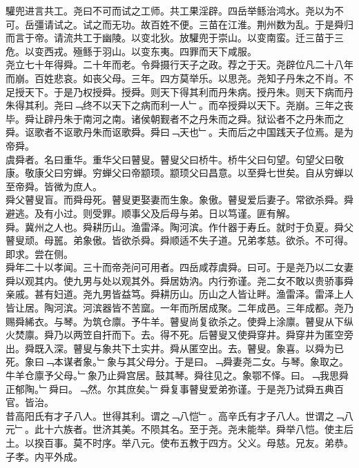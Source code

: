 \documentclass{zhvt-classic}
\begin{document}
\hspace*{2em}驩兜进言共工。尧曰不可而试之工师。共工果淫辟。四岳举鲧治鸿水。尧以为不可。岳彊请试之。试之而无功。故百姓不便。三苗在江淮。荆州数为乱。于是舜归而言于帝。请流共工于幽陵。以变北狄。放驩兜于崇山。以变南蛮。迁三苗于三危。以变西戎。殛鲧于羽山。以变东夷。四罪而天下咸服。\\
\hspace*{2em}尧立七十年得舜。二十年而老。令舜摄行天子之政。荐之于天。尧辟位凡二十八年而崩。百姓悲哀。如丧父母。三年。四方莫举乐。以思尧。尧知子丹朱之不肖。不足授天下。于是乃权授舜。授舜。则天下得其利而丹朱病。授丹朱。则天下病而丹朱得其利。尧曰﹁终不以天下之病而利一人﹂。而卒授舜以天下。尧崩。三年之丧毕。舜让辟丹朱于南河之南。诸侯朝觐者不之丹朱而之舜。狱讼者不之丹朱而之舜。讴歌者不讴歌丹朱而讴歌舜。舜曰﹁天也﹂。夫而后之中国践天子位焉。是为帝舜。\\
\hspace*{2em}虞舜者。名曰重华。重华父曰瞽叟。瞽叟父曰桥牛。桥牛父曰句望。句望父曰敬康。敬康父曰穷蝉。穷蝉父曰帝颛顼。颛顼父曰昌意。以至舜七世矣。自从穷蝉以至帝舜。皆微为庶人。\\
\hspace*{2em}舜父瞽叟盲。而舜母死。瞽叟更娶妻而生象。象傲。瞽叟爱后妻子。常欲杀舜。舜避逃。及有小过。则受罪。顺事父及后母与弟。日以笃谨。匪有解。\\
\hspace*{2em}舜。冀州之人也。舜耕历山。渔雷泽。陶河滨。作什器于寿丘。就时于负夏。舜父瞽叟顽。母嚚。弟象傲。皆欲杀舜。舜顺适不失子道。兄弟孝慈。欲杀。不可得。即求。尝在侧。\\
\hspace*{2em}舜年二十以孝闻。三十而帝尧问可用者。四岳咸荐虞舜。曰可。于是尧乃以二女妻舜以观其内。使九男与处以观其外。舜居妫汭。内行弥谨。尧二女不敢以贵骄事舜亲戚。甚有妇道。尧九男皆益笃。舜耕历山。历山之人皆让畔。渔雷泽。雷泽上人皆让居。陶河滨。河滨器皆不苦窳。一年而所居成聚。二年成邑。三年成都。尧乃赐舜絺衣。与琴。为筑仓廪。予牛羊。瞽叟尚复欲杀之。使舜上涂廪。瞽叟从下纵火焚廪。舜乃以两笠自扞而下。去。得不死。后瞽叟又使舜穿井。舜穿井为匿空旁出。舜既入深。瞽叟与象共下土实井。舜从匿空出。去。瞽叟。象喜。以舜为已死。象曰﹁本谋者象。﹂象与其父母分。于是曰。﹁舜妻尧二女。与琴。象取之。牛羊仓廪予父母。﹂象乃止舜宫居。鼓其琴。舜往见之。象鄂不怿。曰。﹁我思舜正郁陶。﹂舜曰。﹁然。尔其庶矣。﹂舜复事瞽叟爱弟弥谨。于是尧乃试舜五典百官。皆治。\\
\hspace*{2em}昔高阳氏有才子八人。世得其利。谓之﹁八恺﹂。高辛氏有才子八人。世谓之﹁八元﹂。此十六族者。世济其美。不陨其名。至于尧。尧未能举。舜举八恺。使主后土。以揆百事。莫不时序。举八元。使布五教于四方。父义。母慈。兄友。弟恭。子孝。内平外成。\\
\end{document}
